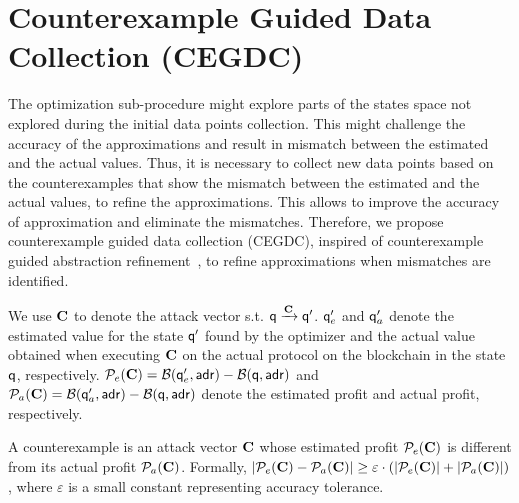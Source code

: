 \section{Counterexample Guided Data Collection (CEGDC)} \label{sec:cegdc}
The optimization sub-procedure might explore parts of the states space not explored during the initial data points collection. This might challenge the accuracy of the approximations and result in mismatch between the estimated  and the actual values. Thus, it is necessary to collect new data points based on the counterexamples that show the mismatch between the estimated and the actual values, to refine the approximations. 
This allows to improve the accuracy of approximation and eliminate the mismatches. 
Therefore, we propose counterexample guided data collection (CEGDC), inspired of counterexample guided abstraction refinement~\cite{clarke2000counterexample}, to refine approximations when mismatches are identified. 

We use $\mathbf{C}$ to denote the attack vector s.t. $\mathsf{q} \xrightarrow{\mathbf{C}} \mathsf{q}'$. 
$\mathsf{q}'_{e}$ and $\mathsf{q}'_{a}$ denote the estimated value for the state $\mathsf{q}'$ found by the optimizer and the actual value obtained when executing $\mathbf{C}$ on the actual protocol on the blockchain in the state $\mathsf{q}$, respectively. 
$\mathcal{P}_e(\mathbf{C}) = \mathcal{B}(\mathsf{q}'_{e},\mathsf{adr}) -  \mathcal{B}(\mathsf{q},\mathsf{adr})$ and $\mathcal{P}_a(\mathbf{C}) = \mathcal{B}(\mathsf{q}'_{a},\mathsf{adr}) -  \mathcal{B}(\mathsf{q},\mathsf{adr})$ denote the estimated profit and actual profit, respectively. 

\begin{definition} \label{counterexample}
A counterexample is an attack vector $\mathbf{C}$ whose estimated profit $\mathcal{P}_e(\mathbf{C})$ is different from its actual profit $\mathcal{P}_a(\mathbf{C})$. Formally, $|\mathcal{P}_e(\mathbf{C}) - \mathcal{P}_a(\mathbf{C})| \geq \varepsilon \cdot (|\mathcal{P}_e(\mathbf{C})| + |\mathcal{P}_a(\mathbf{C})|) $, where $\varepsilon$ is a small constant representing accuracy tolerance.
\end{definition}


